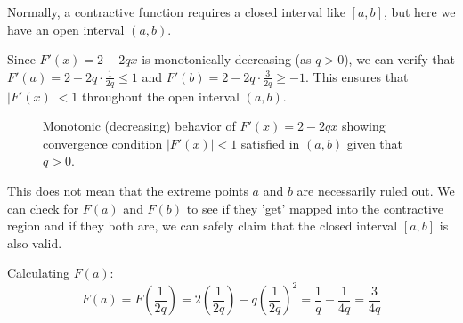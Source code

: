Normally, a contractive function requires a closed interval like $[a,b]$, but here we have an open interval $(a,b)$. 

Since $F'(x) = 2 - 2qx$ is monotonically decreasing (as $q > 0$), we can verify that $F'(a) = 2 - 2q \cdot \frac{1}{2q} \leq 1$ and $F'(b) = 2 - 2q \cdot \frac{3}{2q} \geq -1$. This ensures that $|F'(x)| < 1$ throughout the open interval $(a,b)$.

\begin{figure}[h!]
\centering
{}
\caption{Monotonic (decreasing) behavior of $F'(x) = 2-2qx$ showing convergence condition $|F'(x)| < 1$ satisfied in $(a,b)$ given that $q > 0$.}
\label{fig:q04_derivative}
\end{figure}

This does not mean that the extreme points $a$ and $b$ are necessarily ruled out. We can check for $F(a)$ and $F(b)$ to see if they 'get' mapped into the contractive region and if they both are, we can safely claim that the closed interval $[a,b]$ is also valid.

Calculating $F(a)$:
$$F(a) = F\left(\frac{1}{2q}\right) = 2\left(\frac{1}{2q}\right) - q\left(\frac{1}{2q}\right)^2 = \frac{1}{q} - \frac{1}{4q} = \frac{3}{4q}$$

